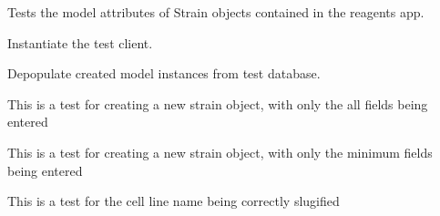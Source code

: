 \documentclass[letterpaper,10pt,english]{sphinxmanual}
\begin{document}

\begin{fulllineitems}
\label{api:experimentdb.reagents.tests.StrainModelTests}
Tests the model attributes of Strain objects contained in the reagents app.


\begin{fulllineitems}
\label{api:experimentdb.reagents.tests.StrainModelTests.setUp}
Instantiate the test client.


\end{fulllineitems}


\begin{fulllineitems}
\label{api:experimentdb.reagents.tests.StrainModelTests.tearDown}
Depopulate created model instances from test database.


\end{fulllineitems}


\begin{fulllineitems}
\label{api:experimentdb.reagents.tests.StrainModelTests.test_create_strain_all_fields}
This is a test for creating a new strain object, with only the all fields being entered


\end{fulllineitems}


\begin{fulllineitems}
\label{api:experimentdb.reagents.tests.StrainModelTests.test_create_strain_minimal}
This is a test for creating a new strain object, with only the minimum fields being entered


\end{fulllineitems}


\begin{fulllineitems}
\label{api:experimentdb.reagents.tests.StrainModelTests.test_strain_slugify}
This is a test for the cell line name being correctly slugified


\end{fulllineitems}


\end{fulllineitems}
\end{document}
